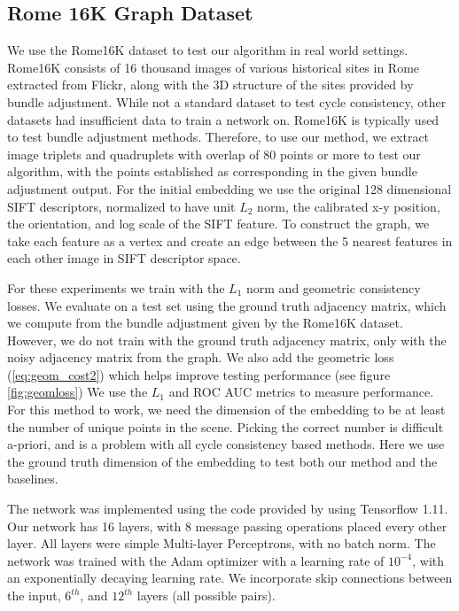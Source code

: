\documentclass[10pt,twocolumn,letterpaper]{article}
\begin{document}
\subsection{Rome 16K Graph Dataset}
We  use the Rome16K dataset \cite{li2010location} to test our algorithm in real world settings.
Rome16K consists of 16 thousand images of various historical sites in Rome extracted from Flickr, along with the 3D structure of the sites provided by bundle adjustment.
While not a standard dataset to test cycle consistency, other datasets had insufficient data to train a network on.
Rome16K is typically used to test bundle adjustment methods.
Therefore, to use our method, we extract image triplets and quadruplets with overlap of 80 points or more to test our algorithm, with the points established as corresponding in the given bundle adjustment output.
For the initial embedding we use the original 128 dimensional SIFT descriptors, normalized to have unit $L_2$ norm, the calibrated x-y position, the orientation, and log scale of the SIFT feature.
To construct the graph, we take each feature as a vertex and create an edge between the 5 nearest features in each other image in SIFT descriptor space.

For these experiments we train with the $L_1$ norm and geometric consistency losses.
We evaluate on a test set using the ground truth adjacency matrix, which we compute from the bundle adjustment given by the Rome16K dataset.
However, we do not train with the ground truth adjacency matrix, only with the noisy adjacency matrix from the graph.
We also add the geometric loss (\ref{eq:geom_cost2}) which helps improve testing performance (see figure \ref{fig:geomloss})
We use the $L_1$ and ROC AUC metrics to measure performance.
For this method to work, we need the dimension of the embedding to be at least the number of unique points in the scene.
Picking the correct number is difficult a-priori, and is a problem with all cycle consistency based methods.
Here we use the ground truth dimension of the embedding to test both our method and the baselines.

The network was implemented using the code provided by \cite{battaglia2018relational} using Tensorflow \cite{tensorflow2015} 1.11.
Our network has 16 layers, with 8 message passing operations placed every other layer.
All layers were simple Multi-layer Perceptrons, with no batch norm.
The network was trained with the Adam optimizer \cite{kingma2014adam} with a learning rate of $10^{-4}$, with an exponentially decaying learning rate.
We incorporate skip connections between the input, $6^{th}$, and $12^{th}$ layers (all possible pairs). 
\end{document}
